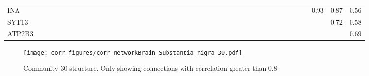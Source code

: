 \begin{longtable}{lrrrrrrrrrrrrrrrrrrrrrrrrrrrrrrrrrrrrrrrrrrr}
INA      &            &             &             &             &              &            &               &             &            &            &               &            &            &             &              &                &              &            &             &              &             &              &            &            &              &             &              &              &              &            &               &              &            &             &              &              &             &              &              &           &        0.93 &         0.87 &          0.56 \\
SYT13    &            &             &             &             &              &            &               &             &            &            &               &            &            &             &              &                &              &            &             &              &             &              &            &            &              &             &              &              &              &            &               &              &            &             &              &              &             &              &              &           &             &         0.72 &          0.58 \\
ATP2B3   &            &             &             &             &              &            &               &             &            &            &               &            &            &             &              &                &              &            &             &              &             &              &            &            &              &             &              &              &              &            &               &              &            &             &              &              &             &              &              &           &             &              &          0.69 \\
\end{longtable}


\begin{figure}[h!]
\centering
\texttt{[image: corr\_figures/corr\_networkBrain\_Substantia\_nigra\_30.pdf]}
\caption{Community 30 structure. Only showing connections with correlation greater than 0.8}
\end{figure}




